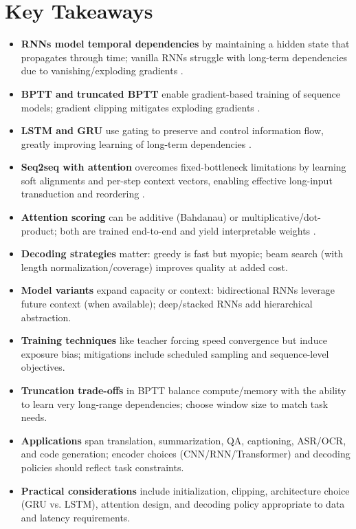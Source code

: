 
\section*{Key Takeaways}
\label{sec:ch10-key-takeaways}

\begin{itemize}
    \item \textbf{RNNs model temporal dependencies} by maintaining a hidden state that propagates through time; vanilla RNNs struggle with long-term dependencies due to vanishing/exploding gradients \cite{GoodfellowEtAl2016}.
    \item \textbf{BPTT and truncated BPTT} enable gradient-based training of sequence models; gradient clipping mitigates exploding gradients \cite{GoodfellowEtAl2016,Rumelhart1986}.
    \item \textbf{LSTM and GRU} use gating to preserve and control information flow, greatly improving learning of long-term dependencies \cite{Hochreiter1997,Cho2014}.
    \item \textbf{Seq2seq with attention} overcomes fixed-bottleneck limitations by learning soft alignments and per-step context vectors, enabling effective long-input transduction and reordering \cite{Bahdanau2014,Vaswani2017}.
    \item \textbf{Attention scoring} can be additive (Bahdanau) or multiplicative/dot-product; both are trained end-to-end and yield interpretable weights \cite{Bahdanau2014,Vaswani2017}.
    \item \textbf{Decoding strategies} matter: greedy is fast but myopic; beam search (with length normalization/coverage) improves quality at added cost.
    \item \textbf{Model variants} expand capacity or context: bidirectional RNNs leverage future context (when available); deep/stacked RNNs add hierarchical abstraction.
    \item \textbf{Training techniques} like teacher forcing speed convergence but induce exposure bias; mitigations include scheduled sampling and sequence-level objectives.
    \item \textbf{Truncation trade-offs} in BPTT balance compute/memory with the ability to learn very long-range dependencies; choose window size to match task needs.
    \item \textbf{Applications} span translation, summarization, QA, captioning, ASR/OCR, and code generation; encoder choices (CNN/RNN/Transformer) and decoding policies should reflect task constraints.
    \item \textbf{Practical considerations} include initialization, clipping, architecture choice (GRU vs. LSTM), attention design, and decoding policy appropriate to data and latency requirements.
\end{itemize}


